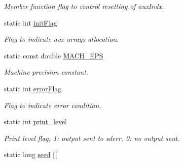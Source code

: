 \begin{DoxyCompactItemize}
\begin{DoxyCompactList}\small\item\em Member function flag to control resetting of auxIndx. \item\end{DoxyCompactList}\item 
\hypertarget{classDMatrix_a372c2986dfa355aa97371f996b5daa48}{
static int \hyperlink{classDMatrix_a372c2986dfa355aa97371f996b5daa48}{initFlag}}
\label{classDMatrix_a372c2986dfa355aa97371f996b5daa48}

\begin{DoxyCompactList}\small\item\em Flag to indicate aux arrays allocation. \item\end{DoxyCompactList}\item 
\hypertarget{classDMatrix_afc8acc5933599402803919f0536d8afa}{
static const double \hyperlink{classDMatrix_afc8acc5933599402803919f0536d8afa}{MACH\_\-EPS}}
\label{classDMatrix_afc8acc5933599402803919f0536d8afa}

\begin{DoxyCompactList}\small\item\em Machine precision constant. \item\end{DoxyCompactList}\item 
\hypertarget{classDMatrix_ac1534658aee6a96156f92f0c124cf805}{
static int \hyperlink{classDMatrix_ac1534658aee6a96156f92f0c124cf805}{errorFlag}}
\label{classDMatrix_ac1534658aee6a96156f92f0c124cf805}

\begin{DoxyCompactList}\small\item\em Flag to indicate error condition. \item\end{DoxyCompactList}\item 
\hypertarget{classDMatrix_aac5e51f153fa877df6a37998a663a80f}{
static int \hyperlink{classDMatrix_aac5e51f153fa877df6a37998a663a80f}{print\_\-level}}
\label{classDMatrix_aac5e51f153fa877df6a37998a663a80f}

\begin{DoxyCompactList}\small\item\em Print level flag, 1: output sent to sderr, 0: no output sent. \item\end{DoxyCompactList}\item 
\hypertarget{classDMatrix_abc1151795b37eb105f0a56cff7f0dbd9}{
static long \hyperlink{classDMatrix_abc1151795b37eb105f0a56cff7f0dbd9}{seed} \mbox{[}$\,$\mbox{]}}
\label{classDMatrix_abc1151795b37eb105f0a56cff7f0dbd9}


\end{DoxyCompactItemize}
